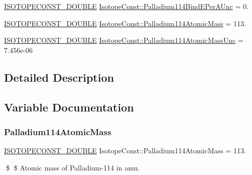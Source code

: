 \begin{DoxyCompactItemize}
\mbox{\hyperlink{group___isotope_const-_macros_ga8f45a7272ce02c0b4c65c44636ed719a}{I\+S\+O\+T\+O\+P\+E\+C\+O\+N\+S\+T\+\_\+\+D\+O\+U\+B\+LE}} \mbox{\hyperlink{group___isotope_const-_palladium-_pd114_ga860eb58d8a03ca58ad0cdffaa052f481}{Isotope\+Const\+::\+Palladium114\+Bind\+E\+Per\+A\+Unc}} = 0.
\item 
\mbox{\hyperlink{group___isotope_const-_macros_ga8f45a7272ce02c0b4c65c44636ed719a}{I\+S\+O\+T\+O\+P\+E\+C\+O\+N\+S\+T\+\_\+\+D\+O\+U\+B\+LE}} \mbox{\hyperlink{group___isotope_const-_palladium-_pd114_ga1906495f274657a5dcb7e015eab36385}{Isotope\+Const\+::\+Palladium114\+Atomic\+Mass}} = 113.
\item 
\mbox{\hyperlink{group___isotope_const-_macros_ga8f45a7272ce02c0b4c65c44636ed719a}{I\+S\+O\+T\+O\+P\+E\+C\+O\+N\+S\+T\+\_\+\+D\+O\+U\+B\+LE}} \mbox{\hyperlink{group___isotope_const-_palladium-_pd114_gaf5dcc96c2eaa4f4f6982785bfb4c4773}{Isotope\+Const\+::\+Palladium114\+Atomic\+Mass\+Unc}} = 7.\+456e-\/06
\end{DoxyCompactItemize}


\subsection{Detailed Description}


\subsection{Variable Documentation}
\mbox{\label{group___isotope_const-_palladium-_pd114_ga1906495f274657a5dcb7e015eab36385}} 
\subsubsection{\texorpdfstring{Palladium114\+Atomic\+Mass}{Palladium114AtomicMass}}
{\footnotesize\ttfamily \mbox{\hyperlink{group___isotope_const-_macros_ga8f45a7272ce02c0b4c65c44636ed719a}{I\+S\+O\+T\+O\+P\+E\+C\+O\+N\+S\+T\+\_\+\+D\+O\+U\+B\+LE}} Isotope\+Const\+::\+Palladium114\+Atomic\+Mass = 113.}

\$ \$ Atomic mass of Palladium-\/114 in amu. \mbox{\label{group___isotope_const-_palladium-_pd114_gaf5dcc96c2eaa4f4f6982785bfb4c4773}} 
